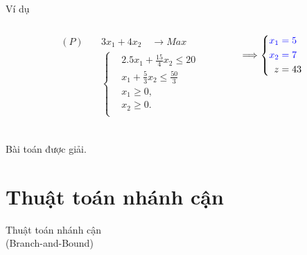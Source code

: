 \documentclass{beamer}
\begin{document}
\begin{frame}{Ví dụ}
    \begin{columns}
    \begin{column}{0.1\textwidth}
    \end{column}
    \begin{column}{0.4\textwidth}
        \begin{equation*}
        \begin{split}
            (P) \quad & 3x_1 + 4x_2 \quad \longrightarrow Max \\
            & \left\{\begin{split}
            & 2.5x_1 + \frac{15}{4}x_2 \leq 20 \\
            & x_1 + \frac{5}{3}x_2 \leq \frac{50}{3} \\
            &x_1 \geq 0, \\
            &x_2 \geq 0. \\
            \end{split}\right. \\
        \end{split}
        \end{equation*}
    \end{column}
    \begin{column}{0.4\textwidth}
        \begin{equation*}
            \Longrightarrow
            \left\{\begin{split}
            \color{blue} x_1 &\color{blue} = 5 \\
            \color{blue} x_2 &\color{blue} = 7 \\
            z& =43
        \end{split}\right.
        \end{equation*}
    \end{column}
    \begin{column}{0.1\textwidth}
    \end{column}
    \end{columns}
    \vspace{1cm}
    \center
    \Large
    Bài toán được giải.
\end{frame}

\section{Thuật toán nhánh cận}
\begin{frame}
   \center
   \huge Thuật toán nhánh cận \\ (Branch-and-Bound)
\end{frame}
\end{document}
